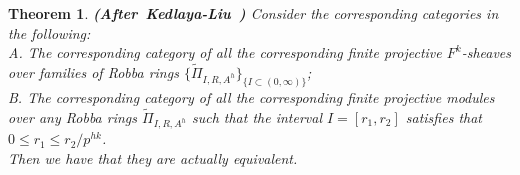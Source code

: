 \documentclass[12pt]{amsart}
\newtheorem{theorem}{Theorem}[section]
\theoremstyle{definition}
\numberwithin{equation}{section}
\begin{document}
\begin{theorem}\mbox{\bf{(After Kedlaya-Liu \cite[Theorem 4.6.1]{KL2})}}
Consider the corresponding categories in the following:\\
A. The corresponding category of all the corresponding finite projective $F^k$-sheaves over families of Robba rings $\{\widetilde{\Pi}_{I,R,A^h}\}_{\{I\subset (0,\infty)\}}$;\\
B. The corresponding category of all the corresponding finite projective modules over any Robba rings $\widetilde{\Pi}_{I,R,A^h}$ such that the interval $I=[r_1,r_2]$ satisfies that $0\leq r_1 \leq r_2/p^{hk}$.\\
Then we have that they are actually equivalent.


\end{theorem}
\end{document}
